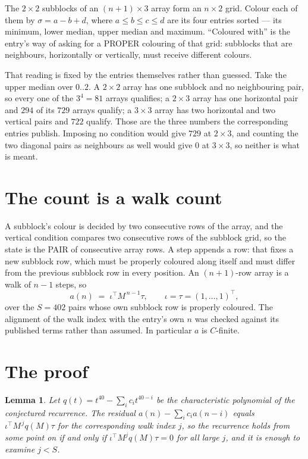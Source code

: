 \documentclass[11pt,a4paper]{article}
\theoremstyle{plain}
\newtheorem{lemma}[theorem]{Lemma}
\theoremstyle{definition}
\begin{document}
The $2\times2$ subblocks of an $(n+1)\times3$ array form an
$n\times2$ grid. Colour each of them by $\sigma=a-b+d$, where $a\le b\le c\le d$ are its four entries sorted --- its minimum, lower median, upper median and maximum. ``Coloured with'' is the entry's way of
asking for a PROPER colouring of that grid: subblocks that are neighbours, horizontally or
vertically, must receive different colours.

That reading is fixed by the entries themselves rather than guessed. Take the upper median
over $0..2$. A $2\times2$ array has one subblock and no neighbouring pair, so every one of the
$3^4=81$ arrays qualifies; a $2\times3$ array has one horizontal pair and $294$ of its $729$
arrays qualify; a $3\times3$ array has two horizontal and two vertical pairs and $722$
qualify. Those are the three numbers the corresponding entries publish. Imposing no condition
would give $729$ at $2\times3$, and counting the two diagonal pairs as neighbours as well
would give $0$ at $3\times3$, so neither is what is meant.

\section{The count is a walk count}

A subblock's colour is decided by two consecutive rows of the array, and
the vertical condition compares two consecutive rows of the subblock grid, so the state is the
PAIR of consecutive array rows. A step appends a row: that fixes a new subblock row, which
must be properly coloured along itself and must differ from the previous subblock row in every
position. An $(n+1)$-row array is a walk of $n-1$ steps, so
\[
a(n)\;=\;\iota^{\!\top}M^{\,n-1}\tau,\qquad\iota=\tau=(1,\dots,1)^{\!\top},
\]
over the $S=402$ pairs whose own subblock row is properly coloured.
The alignment of the walk index with the entry's own $n$ was checked against its published
terms rather than assumed. In particular $a$ is $C$-finite.

\section{The proof}

\begin{lemma}\label{lem:crit}
Let $q(t)=t^{40}-\sum_i c_it^{40-i}$ be the characteristic polynomial of the
conjectured recurrence. The residual $a(n)-\sum_ic_ia(n-i)$ equals
$\iota^{\!\top}M^{\,j}q(M)\tau$ for the corresponding walk index $j$, so the recurrence
holds from some point on if and only if $\iota^{\!\top}M^{j}q(M)\tau=0$ for all large $j$,
and it is enough to examine $j<S$.
\end{lemma}
\end{document}
